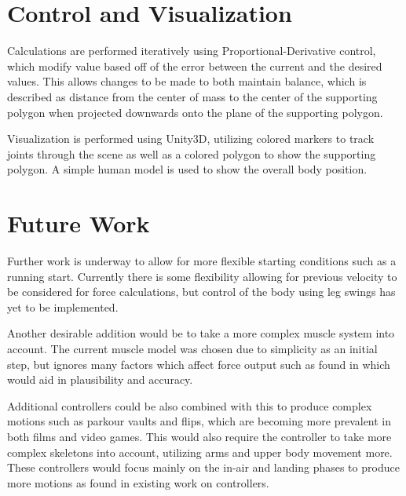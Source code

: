 \documentclass[landscape,26pt]{sciposter}
\begin{document}
\begin{minipage}[t]{14in}
	\section*{Control and Visualization}
		Calculations are performed iteratively using Proportional-Derivative control, which modify value based off of the error between the current and the desired values.  This allows changes to be made to both maintain balance, which is described as distance from the center of mass to the center of the supporting polygon when projected downwards onto the plane of the supporting polygon.

        Visualization is performed using Unity3D, utilizing colored markers to track joints through the scene as well as a colored polygon to show the supporting polygon.  A simple human model is used to show the overall body position.

        \begin{figure}
            \centering
            \caption{}
        \end{figure}

	\section*{Future Work}
        Further work is underway to allow for more flexible starting conditions such as a running start.  Currently there is some flexibility allowing for previous velocity to be considered for force calculations, but control of the body using leg swings has yet to be implemented.

        Another desirable addition would be to take a more complex muscle system into account.  The current muscle model was chosen due to simplicity as an initial step, but ignores many factors which affect force output such as found in \cite{muscle_based_bipeds} which would aid in plausibility and accuracy.

        Additional controllers could be also combined with this to produce complex motions such as parkour vaults and flips, which are becoming more prevalent in both films and video games.  This would also require the controller to take more complex skeletons into account, utilizing arms and upper body movement more.  These controllers would focus mainly on the in-air and landing phases to produce more motions as found in existing work on controllers. \cite{falling_landing, composable_controllers, anim_human_athletics}


\end{minipage}
\end{document}
